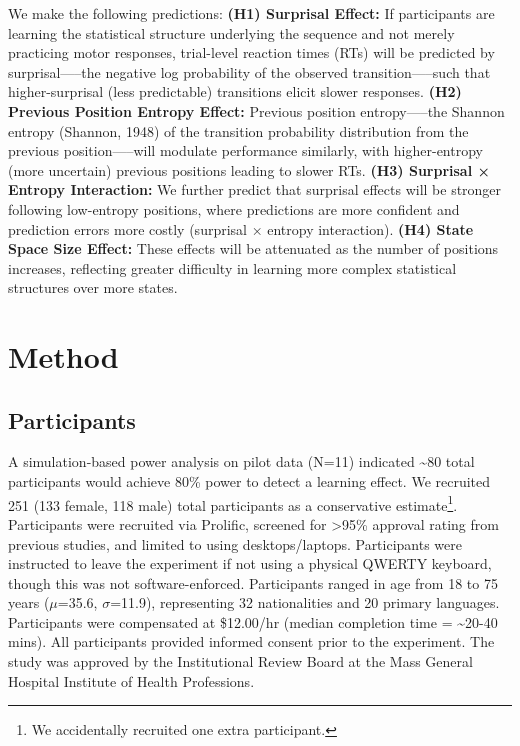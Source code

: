 \documentclass[
  10pt,
  letterpaper]{article}
\begin{document}
We make the following predictions: \textbf{(H1) Surprisal Effect:} If
participants are learning the statistical structure underlying the
sequence and not merely practicing motor responses, trial-level reaction
times (RTs) will be predicted by surprisal-----the negative log
probability of the observed transition-----such that higher-surprisal
(less predictable) transitions elicit slower responses. \textbf{(H2)
Previous Position Entropy Effect:} Previous position entropy-----the
Shannon entropy (Shannon, 1948) of the transition probability
distribution from the previous position-----will modulate performance
similarly, with higher-entropy (more uncertain) previous positions
leading to slower RTs. \textbf{(H3) Surprisal × Entropy Interaction:} We
further predict that surprisal effects will be stronger following
low-entropy positions, where predictions are more confident and
prediction errors more costly (surprisal × entropy interaction).
\textbf{(H4) State Space Size Effect:} These effects will be attenuated
as the number of positions increases, reflecting greater difficulty in
learning more complex statistical structures over more states.

\section{Method}\label{method}

\subsection{Participants}\label{participants}

A simulation-based power analysis on pilot data (N=11) indicated
\textasciitilde80 total participants would achieve 80\% power to detect
a learning effect. We recruited 251 (133 female, 118 male) total
participants as a conservative estimate\footnote{We accidentally
  recruited one extra participant.}. Participants were recruited via
Prolific, screened for \textgreater95\% approval rating from previous
studies, and limited to using desktops/laptops. Participants were
instructed to leave the experiment if not using a physical QWERTY
keyboard, though this was not software-enforced. Participants ranged in
age from 18 to 75 years (\(\mu\)=35.6, \(\sigma\)=11.9), representing 32
nationalities and 20 primary languages. Participants were compensated at
\$12.00/hr (median completion time = \textasciitilde20-40 mins). All
participants provided informed consent prior to the experiment. The
study was approved by the Institutional Review Board at the Mass General
Hospital Institute of Health Professions.
\end{document}
